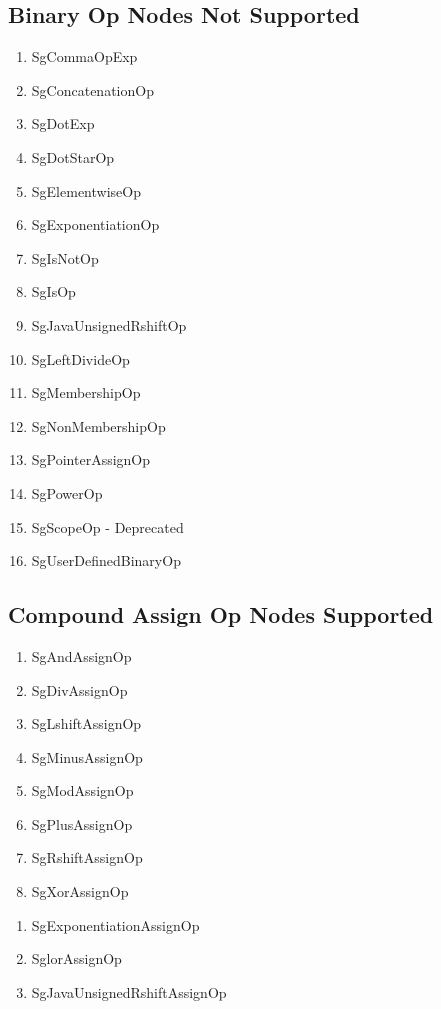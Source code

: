\documentclass[11pt]{article}
\begin{document}
{\begin{enumeration}
\subsection{Binary Op Nodes Not Supported}
\begin{enumerate}
\item SgCommaOpExp
\item SgConcatenationOp
\item SgDotExp
\item SgDotStarOp
\item SgElementwiseOp
\item SgExponentiationOp
\item SgIsNotOp
\item SgIsOp
\item SgJavaUnsignedRshiftOp
\item SgLeftDivideOp
\item SgMembershipOp
\item SgNonMembershipOp
\item SgPointerAssignOp
\item SgPowerOp
\item SgScopeOp - Deprecated
\item SgUserDefinedBinaryOp
\end{enumerate}

\subsection{Compound Assign Op Nodes Supported}
\begin{enumerate}
\item SgAndAssignOp
\item SgDivAssignOp
\item SgLshiftAssignOp
\item SgMinusAssignOp
\item SgModAssignOp
\item SgPlusAssignOp
\item SgRshiftAssignOp
\item SgXorAssignOp
\end{enumerate}

\begin{enumerate}
\item SgExponentiationAssignOp
\item SglorAssignOp
\item SgJavaUnsignedRshiftAssignOp
\end{enumerate}


\end{enumeration}}
\end{document}
